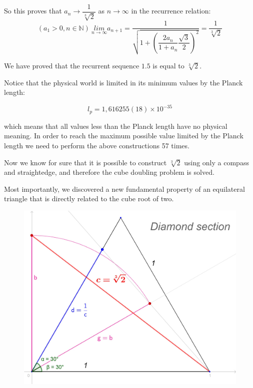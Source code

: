 \documentclass[12pt, letterpaper, oneside]{report}
\begin{document}
\vspace{10mm}
So this proves that $a_{n} \to \dfrac{1}{\sqrt[3]{2}}$ as $n\to \infty$  in the recurrence relation:
\[
( a_{1} > 0,  n \in \mathbb N ) \ \underset{n\to \infty }{lim} a_{n+1} = \dfrac{ 1 }{ \sqrt{ 1 + \left( \dfrac{ 2 a_{ n } }{ 1 + a_{ n } } \dfrac{ \sqrt{ 3 } }{ 2 } \right)^{2} } } =\dfrac{ 1 }{ \sqrt[3]{ 2 } }
\]
 \newpage
 \par
We have proved that the recurrent sequence $1.5$ is equal to $\sqrt[3] {2}$.
\newline
\par
Notice that the physical world is limited in its minimum values by the Planck length:

\[ l_{p} = 1,616255(18) \times 10^{-35} \]

which means that all values less than the Planck length have no physical meaning. In order to reach the maximum possible value limited by the Planck length we need to perform the above constructions 57 times.
\\
\par
Now we know for sure that it is possible to construct $\sqrt[3]{2}$ using only a compass and straightedge, and therefore the cube doubling problem is solved. 
\\
\par 
Most importantly, we discovered a new fundamental property of an equilateral triangle that is directly related to the cube root of two.
\\

\begin{figure}[h]
	\centering
	\includegraphics[width=0.7\linewidth]{images/ds_def.jpg}
	
	\label{fig:Diamond Section}
\end{figure}

\newpage
\end{document}
